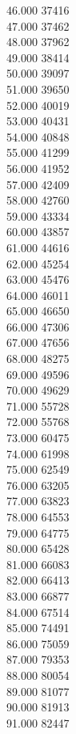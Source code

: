 { 46.000	37416 \\
 47.000	37462 \\
 48.000	37962 \\
 49.000	38414 \\
 50.000	39097 \\
 51.000	39650 \\
 52.000	40019 \\
 53.000	40431 \\
 54.000	40848 \\
 55.000	41299 \\
 56.000	41952 \\
 57.000	42409 \\
 58.000	42760 \\
 59.000	43334 \\
 60.000	43857 \\
 61.000	44616 \\
 62.000	45254 \\
 63.000	45476 \\
 64.000	46011 \\
 65.000	46650 \\
 66.000	47306 \\
 67.000	47656 \\
 68.000	48275 \\
 69.000	49596 \\
 70.000	49629 \\
 71.000	55728 \\
 72.000	55768 \\
 73.000	60475 \\
 74.000	61998 \\
 75.000	62549 \\
 76.000	63205 \\
 77.000	63823 \\
 78.000	64553 \\
 79.000	64775 \\
 80.000	65428 \\
 81.000	66083 \\
 82.000	66413 \\
 83.000	66877 \\
 84.000	67514 \\
 85.000	74491 \\
 86.000	75059 \\
 87.000	79353 \\
 88.000	80054 \\
 89.000	81077 \\
 90.000	81913 \\
 91.000	82447 \\
}
